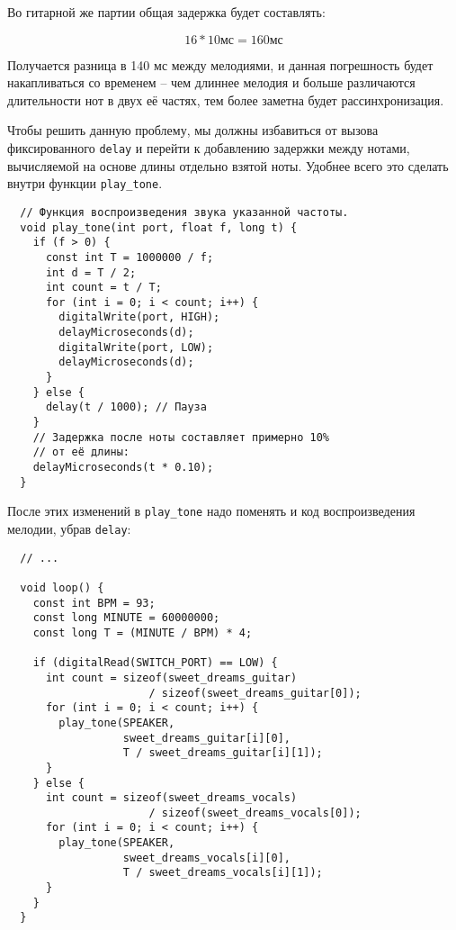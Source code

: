 \documentclass[../sparc.tex]{subfiles}
\begin{document}
Во гитарной же партии общая задержка будет составлять:

\begin{equation}
  16 * 10 \mbox{мс} = 160 \mbox{мс}
\end{equation}

Получается разница в 140 мс между мелодиями, и данная погрешность будет
накапливаться со временем -- чем длиннее мелодия и больше различаются
длительности нот в двух её частях, тем более заметна будет рассинхронизация.

Чтобы решить данную проблему, мы должны избавиться от вызова фиксированного
\texttt{delay} и перейти к добавлению задержки между нотами, вычисляемой на
основе длины отдельно взятой ноты.  Удобнее всего это сделать внутри функции
\texttt{play\_tone}.

\begin{verbatim}
  // Функция воспроизведения звука указанной частоты.
  void play_tone(int port, float f, long t) {
    if (f > 0) {
      const int T = 1000000 / f;
      int d = T / 2;
      int count = t / T;
      for (int i = 0; i < count; i++) {
        digitalWrite(port, HIGH);
        delayMicroseconds(d);
        digitalWrite(port, LOW);
        delayMicroseconds(d);
      }
    } else {
      delay(t / 1000); // Пауза
    }
    // Задержка после ноты составляет примерно 10%
    // от её длины:
    delayMicroseconds(t * 0.10);
  }
\end{verbatim}

После этих изменений в \texttt{play\_tone} надо поменять и код воспроизведения
мелодии, убрав \texttt{delay}:

\begin{verbatim}
  // ...

  void loop() {
    const int BPM = 93;
    const long MINUTE = 60000000;
    const long T = (MINUTE / BPM) * 4;

    if (digitalRead(SWITCH_PORT) == LOW) {
      int count = sizeof(sweet_dreams_guitar)
                      / sizeof(sweet_dreams_guitar[0]);
      for (int i = 0; i < count; i++) {
        play_tone(SPEAKER,
                  sweet_dreams_guitar[i][0],
                  T / sweet_dreams_guitar[i][1]);
      }
    } else {
      int count = sizeof(sweet_dreams_vocals)
                      / sizeof(sweet_dreams_vocals[0]);
      for (int i = 0; i < count; i++) {
        play_tone(SPEAKER,
                  sweet_dreams_vocals[i][0],
                  T / sweet_dreams_vocals[i][1]);
      }
    }
  }
\end{verbatim}
\end{document}

